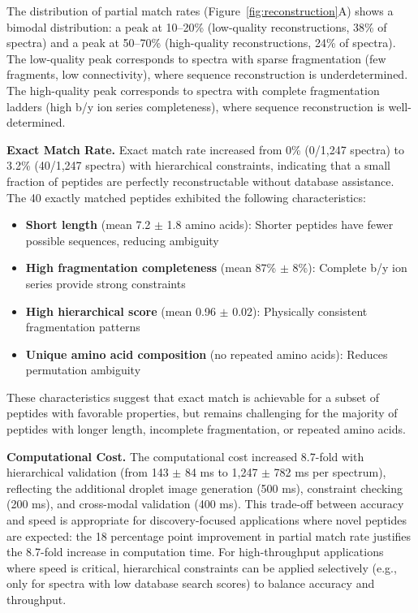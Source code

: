 \documentclass[11pt,twocolumn]{article}
\begin{document}
The distribution of partial match rates (Figure~\ref{fig:reconstruction}A) shows a bimodal distribution: a peak at 10--20\% (low-quality reconstructions, 38\% of spectra) and a peak at 50--70\% (high-quality reconstructions, 24\% of spectra). The low-quality peak corresponds to spectra with sparse fragmentation (few fragments, low connectivity), where sequence reconstruction is underdetermined. The high-quality peak corresponds to spectra with complete fragmentation ladders (high b/y ion series completeness), where sequence reconstruction is well-determined.

\textbf{Exact Match Rate.} Exact match rate increased from 0\% (0/1,247 spectra) to 3.2\% (40/1,247 spectra) with hierarchical constraints, indicating that a small fraction of peptides are perfectly reconstructable without database assistance. The 40 exactly matched peptides exhibited the following characteristics:
\begin{itemize}[leftmargin=*]
    \item \textbf{Short length} (mean 7.2 $\pm$ 1.8 amino acids): Shorter peptides have fewer possible sequences, reducing ambiguity
    \item \textbf{High fragmentation completeness} (mean 87\% $\pm$ 8\%): Complete b/y ion series provide strong constraints
    \item \textbf{High hierarchical score} (mean 0.96 $\pm$ 0.02): Physically consistent fragmentation patterns
    \item \textbf{Unique amino acid composition} (no repeated amino acids): Reduces permutation ambiguity
\end{itemize}
These characteristics suggest that exact match is achievable for a subset of peptides with favorable properties, but remains challenging for the majority of peptides with longer length, incomplete fragmentation, or repeated amino acids.

\textbf{Computational Cost.} The computational cost increased 8.7-fold with hierarchical validation (from 143 $\pm$ 84 ms to 1,247 $\pm$ 782 ms per spectrum), reflecting the additional droplet image generation (500 ms), constraint checking (200 ms), and cross-modal validation (400 ms). This trade-off between accuracy and speed is appropriate for discovery-focused applications where novel peptides are expected: the 18 percentage point improvement in partial match rate justifies the 8.7-fold increase in computation time. For high-throughput applications where speed is critical, hierarchical constraints can be applied selectively (e.g., only for spectra with low database search scores) to balance accuracy and throughput.
\end{document}
